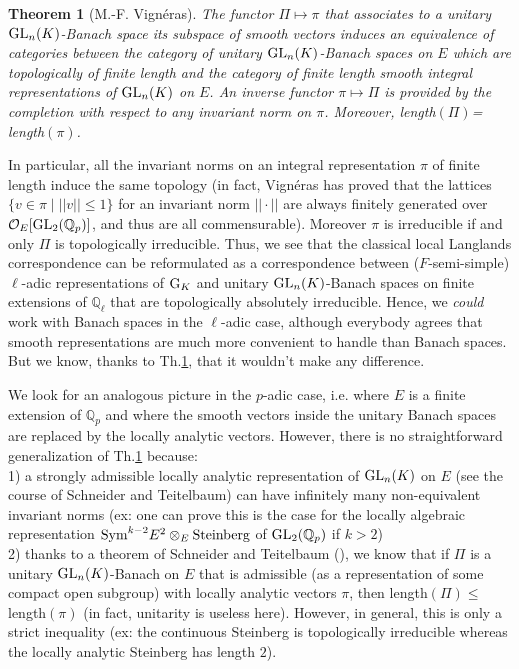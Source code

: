 \documentclass[11pt]{amsart}
\def\Q{{\mathbb Q}_p}
\def\G{{\rm GL}_2(\Q)}
\def\O{{\mathcal O}_E}
\newtheorem{thm}[definit]{\bf{Theorem}}
\begin{document}
 
\begin{thm}[M.-F. Vign\'eras]\label{marie} 
The functor $\Pi\mapsto \pi$ that associates to a unitary ${\rm
  GL}_n(K)$-Banach space its subspace of smooth vectors induces an
equivalence of categories between the category of unitary ${\rm
  GL}_n(K)$-Banach spaces on $E$ which are topologically of finite
length and the category of finite length smooth integral
representations of ${\rm GL}_n(K)$ on $E$. An inverse functor
$\pi\mapsto \Pi$ is provided by the completion with respect to any
invariant norm on $\pi$. Moreover, length$(\Pi)$= length$(\pi)$. 
\end{thm} 
 
In particular, all the invariant norms on an integral representation
$\pi$ of finite length induce the same topology (in fact, Vign\'eras
has proved that the lattices $\{v\in\pi\mid |\!|v|\!|\leq 1\}$ for an
invariant norm $|\!|\!\cdot\!|\!|$ are always finitely generated over
$\O[\G]$, and thus are all commensurable). Moreover $\pi$ is
irreducible if and only $\Pi$ is topologically irreducible. Thus, we
see that the classical local Langlands correspondence can be
reformulated as a correspondence between ($F$-semi-simple) $\ell$-adic
representations of ${\rm G}_K$ and unitary ${\rm GL}_n(K)$-Banach
spaces on finite extensions of ${\mathbb Q}_{\ell}$ that are
topologically absolutely irreducible. Hence, we {\it could} work with
Banach spaces in the $\ell$-adic case, although everybody agrees that
smooth representations are much more convenient to handle than Banach
spaces. But we know, thanks to Th.\ref{marie}, that it wouldn't make
any difference.

 
We look for an analogous picture in the $p$-adic case, i.e. where $E$
is a finite extension of $\Q$ and where the smooth vectors inside the
unitary Banach spaces are replaced by the locally analytic
vectors. However, there is no straightforward generalization of
Th.\ref{marie} because:\\  
1) a strongly admissible locally analytic representation of ${\rm
  GL}_n(K)$ on $E$ (see the course of Schneider and Teitelbaum) can
have infinitely many non-equivalent invariant norms (ex: one can prove
this is the case for the locally algebraic representation ${\rm
  Sym}^{k-2}E^2\otimes_E{\rm Steinberg}$ of $\G$ if $k>2$)\\  
2) thanks to a theorem of Schneider and Teitelbaum (\cite{ST4}), we
know that if $\Pi$ is a unitary ${\rm GL}_n(K)$-Banach on $E$ that is
admissible (as a representation of some compact open subgroup) with
locally analytic vectors $\pi$, then length$(\Pi)\leq$ length$(\pi)$
(in fact, unitarity is useless here). However, in general, this is
only a strict inequality (ex: the continuous Steinberg is
topologically irreducible whereas the locally analytic Steinberg has
length $2$).
 
\end{document}
